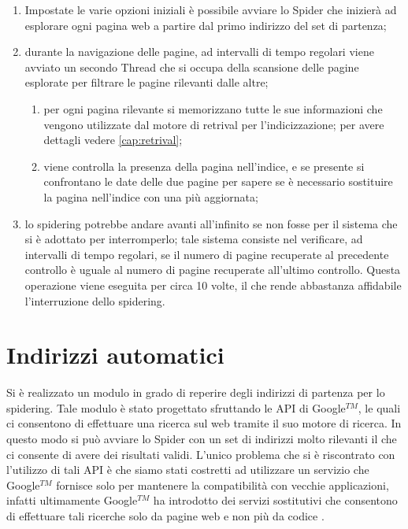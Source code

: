 \begin{enumerate}
\item Impostate le varie opzioni iniziali è possibile avviare lo Spider che inizierà ad esplorare ogni pagina web a partire dal primo indirizzo del set di partenza;
\item durante la navigazione delle pagine, ad intervalli di tempo regolari viene avviato un secondo Thread che si occupa della scansione delle pagine esplorate per filtrare le pagine rilevanti dalle altre;
	\begin{enumerate}
	\item per ogni pagina rilevante si memorizzano tutte le sue informazioni che vengono utilizzate dal motore di retrival per l'indicizzazione; per avere dettagli vedere \ref{cap:retrival};
	\item viene controlla la presenza della pagina nell'indice, e se presente si confrontano le date delle due pagine per sapere se è necessario sostituire la pagina nell'indice con una più aggiornata;
	\end{enumerate}
\item lo spidering potrebbe andare avanti all'infinito se non fosse per il sistema che si è adottato per interromperlo; tale sistema consiste nel verificare, ad intervalli di tempo regolari, se il numero di pagine recuperate al precedente controllo è uguale al numero di pagine recuperate all'ultimo controllo. Questa operazione viene eseguita per circa 10 volte, il che rende abbastanza affidabile l'interruzione dello spidering.
\end{enumerate}
\section{Indirizzi automatici}\label{cap:spider:roots}
Si è realizzato un modulo in grado di reperire degli indirizzi di partenza per lo spidering. Tale modulo è stato progettato sfruttando le API di Google$^{TM}$, le quali ci consentono di effettuare una ricerca sul web tramite il suo motore di ricerca. In questo modo si può avviare lo Spider con un set di indirizzi molto rilevanti il che ci consente di avere dei risultati validi. L'unico problema che si è riscontrato con l'utilizzo di tali API è che siamo stati costretti ad utilizzare un servizio che Google$^{TM}$ fornisce solo per mantenere la compatibilità con vecchie applicazioni, infatti ultimamente Google$^{TM}$ ha introdotto dei servizi sostitutivi che consentono di effettuare tali ricerche solo da pagine web e non più da codice .